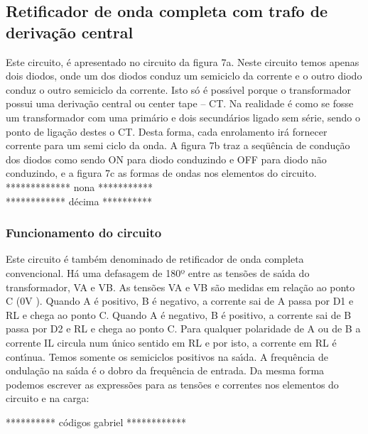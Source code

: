 \subsection{Retificador de onda completa com trafo de deriva\c{c}\~{a}o central}
Este circuito, \'{e} apresentado no circuito da figura 7a. Neste circuito temos apenas dois diodos, onde um dos diodos conduz um semiciclo da corrente e o outro diodo conduz o outro semiciclo da corrente. Isto s\'{o} \'{e} poss\'{\i}vel porque o transformador possui uma deriva\c{c}\~{a}o central ou center tape – CT. Na realidade \'{e} como se fosse um transformador com uma prim\'{a}rio e dois secund\'{a}rios ligado sem s\'{e}rie, sendo o ponto de liga\c{c}\~{a}o destes o CT. Desta forma, cada enrolamento ir\'{a} fornecer corrente para um semi ciclo da onda. A figura 7b traz a seq\"{u}\^{e}ncia de condu\c{c}\~{a}o dos diodos como sendo ON para diodo conduzindo e OFF para diodo n\~{a}o conduzindo, e a figura 7c as formas de ondas nos elementos do circuito. \\

************* nona *********** \\
************ d\'{e}cima ********** \\

 \subsubsection{Funcionamento do circuito}
 Este circuito \'{e} tamb\'{e}m denominado de retificador de onda completa convencional. H\'{a} uma defasagem de 180º entre as tens\~{o}es de sa\'{\i}da do transformador, VA e VB. As tens\~{o}es VA e VB s\~{a}o medidas em rela\c{c}\~{a}o ao ponto C (0V ). Quando A \'{e} positivo, B \'{e} negativo, a corrente sai de A passa por D1 e RL e chega ao ponto C. Quando A \'{e} negativo, B \'{e} positivo, a corrente sai de B passa por D2 e RL e chega ao ponto C. Para qualquer polaridade de A ou de B a corrente IL circula num \'{u}nico sentido em RL e por isto, a corrente em RL \'{e} cont\'{\i}nua. Temos somente os semiciclos positivos na sa\'{\i}da. A frequ\^{e}ncia de ondula\c{c}\~{a}o na sa\'{\i}da \'{e} o dobro da frequ\^{e}ncia de entrada.
Da mesma forma podemos escrever as express\~{o}es para as tens\~{o}es e correntes nos elementos do circuito e na carga:

********** c\'{o}digos gabriel ************ \\